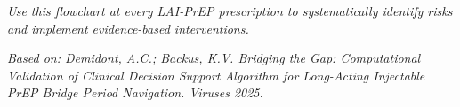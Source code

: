 \documentclass[11pt]{article}
\begin{document}
\vspace{1cm}

\begin{center}
\textit{Use this flowchart at every LAI-PrEP prescription to systematically identify risks and implement evidence-based interventions.}

\vspace{0.3cm}

\textit{Based on: Demidont, A.C.; Backus, K.V. Bridging the Gap: Computational Validation of Clinical Decision Support Algorithm for Long-Acting Injectable PrEP Bridge Period Navigation. Viruses 2025.}
\end{center}
\end{document}
